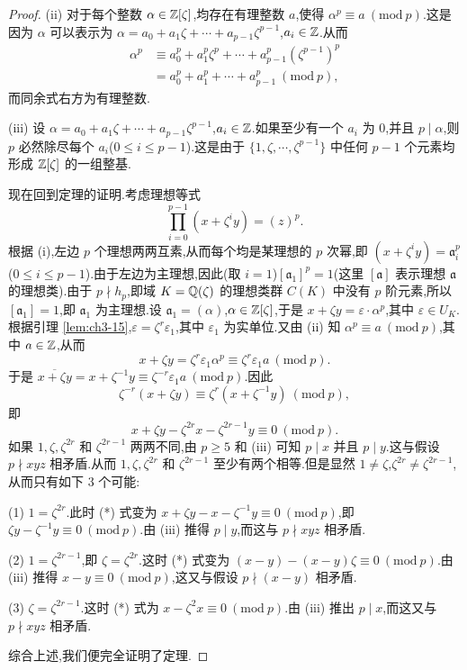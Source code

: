 \begin{proof}
(ii) 对于每个整数 $\alpha\in\mathbb{Z}[\zeta]$,均存在有理整数 $a$,使得 $\alpha^p\equiv a\ (\mathrm{mod}\ p)$.这是因为 $\alpha$ 可以表示为 $\alpha=a_0+a_1\zeta+\cdots+a_{p-1}\zeta^{p-1}$,$a_i\in\mathbb{Z}$.从而
\begin{align*}
  \alpha^p&\equiv a_0^p+a_1^p\zeta^p+\cdots+a_{p-1}^p(\zeta^{p-1})^p\\
  &=a_0^p+a_1^p+\cdots+a_{p-1}^p\ (\mathrm{mod}\ p),
\end{align*}
而同余式右方为有理整数.

(iii) 设 $\alpha=a_0+a_1\zeta+\cdots+a_{p-1}\zeta^{p-1}$,$a_i\in\mathbb{Z}$.如果至少有一个 $a_i$ 为 $0$,并且 $p\mid\alpha$,则 $p$ 必然除尽每个 $a_i$($0\leqslant i\leqslant p-1$).这是由于 $\{1,\zeta,\cdots,\zeta^{p-1}\}$ 中任何 $p-1$ 个元素均形成 $\mathbb{Z}[\zeta]$ 的一组整基.

现在回到定理的证明.考虑理想等式
\[
  \prod_{i=0}^{p-1}(x+\zeta^iy)=(z)^p.
\]
根据 (i),左边 $p$ 个理想两两互素,从而每个均是某理想的 $p$ 次幂,即 $(x+\zeta^iy)=\mathfrak{a}_i^p$($0\leqslant i\leqslant p-1$).由于左边为主理想,因此(取 $i=1$)$[\mathfrak{a}_1]^p=1$(这里 $[\mathfrak{a}]$ 表示理想 $\mathfrak{a}$ 的理想类).由于 $p\nmid h_p$,即域 $K=\mathbb{Q}(\zeta)$ 的理想类群 $C(K)$ 中没有 $p$ 阶元素,所以 $[\mathfrak{a}_1]=1$,即 $\mathfrak{a}_1$ 为主理想.设 $\mathfrak{a}_1=(\alpha)$,$\alpha\in\mathbb{Z}[\zeta]$,于是 $x+\zeta y=\varepsilon\cdot\alpha^p$,其中 $\varepsilon\in U_K$.根据引理 \ref{lem:ch3-15},$\varepsilon=\zeta^r\varepsilon_1$,其中 $\varepsilon_1$ 为实单位.又由 (ii) 知 $\alpha^p\equiv a\ (\mathrm{mod}\ p)$,其中 $a\in\mathbb{Z}$,从而
\[
  x+\zeta y=\zeta^r\varepsilon_1\alpha^p\equiv\zeta^r\varepsilon_1a\ (\mathrm{mod}\ p).
\]
于是 $\overline{x+\zeta y}=x+\zeta^{-1}y\equiv\zeta^{-r}\varepsilon_1a\ (\mathrm{mod}\ p)$.因此
\[
  \zeta^{-r}(x+\zeta y)\equiv\zeta^r(x+\zeta^{-1}y)\ (\mathrm{mod}\ p),
\]
即
\begin{equation}  x+\zeta y-\zeta^{2r}x-\zeta^{2r-1}y\equiv 0\ (\mathrm{mod}\ p).\tag{*}\end{equation}
如果 $1,\zeta,\zeta^{2r}$ 和 $\zeta^{2r-1}$ 两两不同,由 $p\geqslant 5$ 和 (iii) 可知 $p\mid x$ 并且 $p\mid y$.这与假设 $p\nmid xyz$ 相矛盾.从而 $1,\zeta,\zeta^{2r}$ 和 $\zeta^{2r-1}$ 至少有两个相等.但是显然 $1\neq\zeta$,$\zeta^{2r}\neq\zeta^{2r-1}$,从而只有如下 $3$ 个可能:

(1) $1=\zeta^{2r}$.此时 (*) 式变为 $x+\zeta y-x-\zeta^{-1}y\equiv 0\ (\mathrm{mod}\ p)$,即 $\zeta y-\zeta^{-1}y\equiv 0\ (\mathrm{mod}\ p)$.由 (iii) 推得 $p\mid y$,而这与 $p\nmid xyz$ 相矛盾.

(2) $1=\zeta^{2r-1}$,即 $\zeta=\zeta^{2r}$.这时 (*) 式变为 $(x-y)-(x-y)\zeta\equiv 0\ (\mathrm{mod}\ p)$.由 (iii) 推得 $x-y\equiv 0\ (\mathrm{mod}\ p)$,这又与假设 $p\nmid(x-y)$ 相矛盾.

(3) $\zeta=\zeta^{2r-1}$.这时 (*) 式为 $x-\zeta^2x\equiv 0\ (\mathrm{mod}\ p)$.由 (iii) 推出 $p\mid x$,而这又与 $p\nmid xyz$ 相矛盾.

综合上述,我们便完全证明了定理.
\end{proof}

